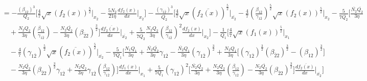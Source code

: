 \documentclass[fleqn, 10pt]{article}
\begin{document}
\begin{equation*}
\begin{split}
    &=     - \frac{(\beta_{12})^3}{Q_2} \Biggl[ \frac{4}{7} \sqrt{x} (f_2(x))^\frac{5}{2} \Bigg|_{x_2} - \frac{5 N_2}{21 \eta} \frac{df_2(x)}{dx} \Bigg|_{x_2} \Biggr] -   \frac{(\gamma_{1\overline{2}})^3}{\overline{Q_{2}}} \Biggl[ \frac{4}{7} \sqrt{x} (\overline{f_{2}(x)})^\frac{5}{2} \Bigg|_{\overline{x_{2}}} -   \frac{4}{7} \left( \frac{\beta_{12}}{\gamma_{1\overline{2}}}\right)^\frac{5}{2} \sqrt{x} (f_2(x))^\frac{5}{2} \Bigg|_{x_2} - \frac{5}{7\overline{Q_{2}}} \Biggl[ \frac{\overline{N_{2}} \overline{Q_{2}}}{3 \eta} \\ & \quad + \frac{N_2 Q_2}{3 \eta} \left( \frac{\beta_{12}}{\gamma_{1\overline{2}}}\right) -  \frac{N_2 \overline{Q_{2}}}{3 \eta} (\beta_{\overline{2}2})^\frac{3}{2} \Biggr] \frac{d\overline{f_{2}(x)}}{dx} \Bigg|_{\overline{x_{2}}} +   \frac{5}{7\overline{Q_{2}}} \frac{N_2 Q_2}{3 \eta} \left( \frac{\beta_{12}}{\gamma_{1\overline{2}}}\right)^2 \frac{df_2(x)}{dx} \Bigg|_{x_2} \Biggr] -   \frac{1}{Q_1} \Biggl[ \frac{4}{7} \sqrt{x} (f_1(x))^\frac{5}{2} \Bigg|_{x_1}  \\ & \quad -   \frac{4}{7} (\gamma_{1\overline{2}})^\frac{5}{2} \sqrt{x} (\overline{f_{2}(x)})^\frac{5}{2} \Bigg|_{\overline{x_{2}}} - \frac{5}{7Q_1} \Biggl[ \frac{N_1 Q_1}{3 \eta} + \frac{\overline{N_{2}} \overline{Q_{2}}}{3 \eta} \gamma_{1\overline{2}} - \frac{\overline{N_{2}} Q_1}{3 \eta} (\gamma_{1\overline{2}})^\frac{3}{2} + \frac{N_2 Q_1}{3 \eta} \bigl[ (\gamma_{1\overline{2}})^\frac{3}{2} (\beta_{\overline{2}2})^\frac{3}{2} - (\beta_{12})^\frac{3}{2} \bigr] \\ & \quad - \frac{N_2 \overline{Q_{2}}}{3 \eta} (\beta_{\overline{2}2})^\frac{3}{2} \gamma_{1\overline{2}} +   \frac{N_2 Q_2}{3 \eta} \gamma_{1\overline{2}} \left( \frac{\beta_{12}}{\gamma_{1\overline{2}}}\right) \Biggr] \frac{df_1(x)}{dx} \Bigg|_{x_1}  + \frac{5}{7 Q_1} (\gamma_{1\overline{2}})^2 \Biggl[ \frac{\overline{N_{2}} \overline{Q_{2}}}{3 \eta} + \frac{N_2 Q_2}{3 \eta} \left( \frac{\beta_{12}}{\gamma_{1\overline{2}}}\right) -   \frac{N_2 \overline{Q_{2}}}{3 \eta} (\beta_{\overline{2}2})^\frac{3}{2} \Biggr] \frac{d\overline{f_{2}(x)}}{dx} \Bigg|_{\overline{x_{2}}} \Biggr]
    \end{split}
\end{equation*}
\end{document}
